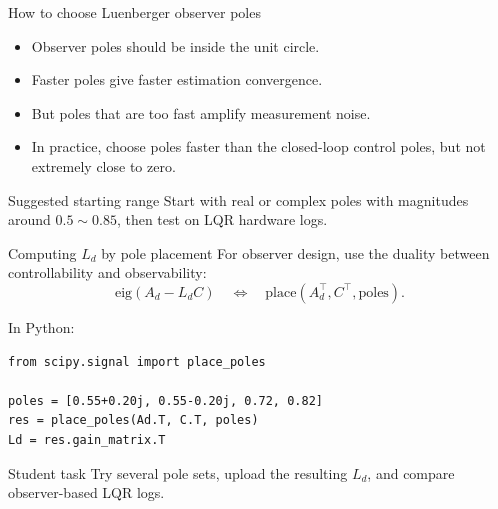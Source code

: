 \documentclass[aspectratio=169]{beamer}
\begin{document}
\begin{frame}{How to choose Luenberger observer poles}
\begin{itemize}
    \item Observer poles should be inside the unit circle.
    \vspace{0.25cm}
    \item Faster poles give faster estimation convergence.
    \vspace{0.25cm}
    \item But poles that are too fast amplify measurement noise.
    \vspace{0.25cm}
    \item In practice, choose poles faster than the closed-loop control poles, but not extremely close to zero.
\end{itemize}

\vspace{0.2cm}
\begin{block}{Suggested starting range}
\small
Start with real or complex poles with magnitudes around \(0.5\sim0.85\), then test on LQR hardware logs.
\end{block}
\end{frame}

\begin{frame}[fragile]{Computing \(L_d\) by pole placement}
For observer design, use the duality between controllability and observability:
\[
\mathrm{eig}(A_d-L_dC)
\quad\Longleftrightarrow\quad
\mathrm{place}(A_d^\top,C^\top,\text{poles}).
\]

\vspace{0.15cm}
In Python:
\begin{lstlisting}[basicstyle=\ttfamily\scriptsize]
from scipy.signal import place_poles

poles = [0.55+0.20j, 0.55-0.20j, 0.72, 0.82]
res = place_poles(Ad.T, C.T, poles)
Ld = res.gain_matrix.T
\end{lstlisting}

\vspace{0.15cm}
\begin{alertblock}{Student task}
\small
Try several pole sets, upload the resulting \(L_d\), and compare observer-based LQR logs.
\end{alertblock}
\end{frame}
\end{document}
